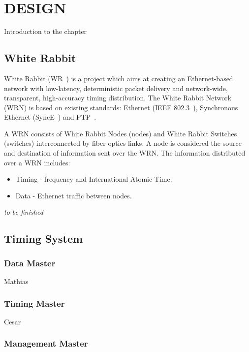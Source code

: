 \section{DESIGN}

Introduction to the chapter

\subsection{White Rabbit}

White Rabbit (WR~\cite{wr}) is a project which aims at creating
an Ethernet-based network with low-latency, deterministic
packet delivery and network-wide, transparent, high-accuracy
timing distribution. The White Rabbit Network (WRN) is
based on existing standards: Ethernet (IEEE 802.3~\cite{internet}),
Synchronous Ethernet (SyncE~\cite{sync}) and PTP~\cite{ptp}. 

A WRN consists of White Rabbit Nodes (nodes) and White
Rabbit Switches (switches) interconnected by fiber optics links. 
A node is considered the source and destination of information sent 
over the WRN. The information distributed over a WRN includes:

\begin{itemize}
    \item Timing - frequency and International Atomic Time.
    \item Data - Ethernet traffic between nodes.
\end{itemize}

\textit{to be finished}

\subsection{Timing System}

\subsubsection{Data Master}

Mathias

\subsubsection{Timing Master}

Cesar

\subsubsection{Management Master}

